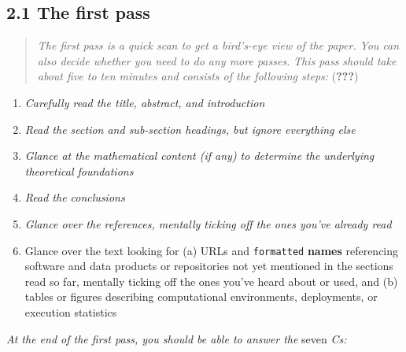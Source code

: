 \documentclass[twocolumn]{article}
\providecommand{\tightlist}{%
  \setlength{\itemsep}{0pt}\setlength{\parskip}{0pt}}
\begin{document}
\hypertarget{the-first-pass}{%
\subsection*{2.1 The first pass}\label{the-first-pass}}

\begin{quote}
\emph{The first pass is a quick scan to get a bird's-eye view of the
paper.} \emph{You can also decide whether you need to do any more
passes.} \emph{This pass should take about five to ten minutes and
consists of the following steps:} ({\textbf{???}})
\end{quote}

\begin{enumerate}
\def\labelenumi{\arabic{enumi}.}
\tightlist
\item
  \emph{Carefully read the title, abstract, and introduction}
\item
  \emph{Read the section and sub-section headings, but ignore everything
  else}
\item
  \emph{Glance at the mathematical content (if any) to determine the
  underlying theoretical foundations}
\item
  \emph{Read the conclusions}
\item
  \emph{Glance over the references, mentally ticking off the ones you've
  already read}
\item
  Glance over the text looking for (a) URLs and \texttt{formatted}
  \textbf{names} referencing software and data products or repositories
  not yet mentioned in the sections read so far, mentally ticking off
  the ones you've heard about or used, and (b) tables or figures
  describing computational environments, deployments, or execution
  statistics
\end{enumerate}

\emph{At the end of the first pass, you should be able to answer the}
seven \emph{Cs:}
\end{document}
